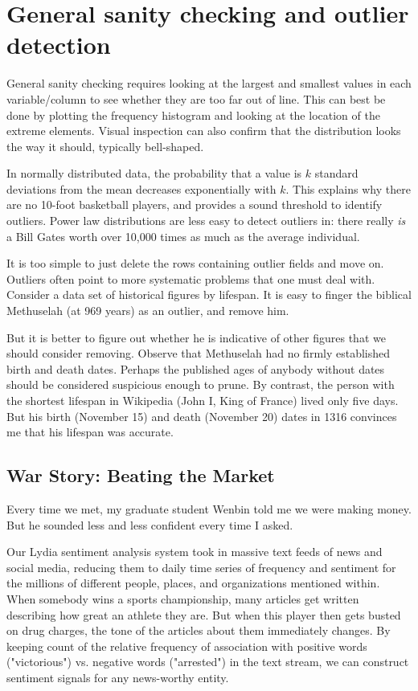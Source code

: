 \documentclass[10pt]{article}
\begin{document}
\section{General sanity checking and outlier detection}

General sanity checking requires looking at the largest and smallest values in each variable/column to see whether they are too far out of line. This can best be done by plotting the frequency histogram and looking at the location of the extreme elements. Visual inspection can also confirm that the distribution looks the way it should, typically bell-shaped.

In normally distributed data, the probability that a value is $k$ standard deviations from the mean decreases exponentially with $k$. This explains why there are no 10-foot basketball players, and provides a sound threshold to identify outliers. Power law distributions are less easy to detect outliers in: there really \textit{is} a Bill Gates worth over 10,000 times as much as the average individual.

It is too simple to just delete the rows containing outlier fields and move on. Outliers often point to more systematic problems that one must deal with. Consider a data set of historical figures by lifespan. It is easy to finger the biblical Methuselah (at 969 years) as an outlier, and remove him.

But it is better to figure out whether he is indicative of other figures that we should consider removing. Observe that Methuselah had no firmly established birth and death dates. Perhaps the published ages of anybody without dates should be considered suspicious enough to prune. By contrast, the person with the shortest lifespan in Wikipedia (John I, King of France) lived only five days. But his birth (November 15) and death (November 20) dates in 1316 convinces me that his lifespan was accurate.

\subsection{War Story: Beating the Market}

Every time we met, my graduate student Wenbin told me we were making money. But he sounded less and less confident every time I asked.

Our Lydia sentiment analysis system took in massive text feeds of news and social media, reducing them to daily time series of frequency and sentiment for the millions of different people, places, and organizations mentioned within. When somebody wins a sports championship, many articles get written describing how great an athlete they are. But when this player then gets busted on drug charges, the tone of the articles about them immediately changes. By keeping count of the relative frequency of association with positive words ("victorious") vs. negative words ("arrested") in the text stream, we can construct sentiment signals for any news-worthy entity.
\end{document}
